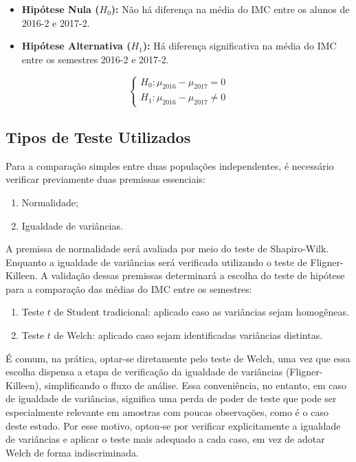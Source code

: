 \documentclass[
]{article}
\providecommand{\tightlist}{%
  \setlength{\itemsep}{0pt}\setlength{\parskip}{0pt}}
\begin{document}
\begin{itemize}
\tightlist
\item
  \textbf{Hipótese Nula (\(H_0\)):} Não há diferença na média do IMC entre os alunos de 2016-2 e 2017-2.
\item
  \textbf{Hipótese Alternativa (\(H_1\)):} Há diferença significativa na média do IMC entre os semestres 2016-2 e 2017-2.
\end{itemize}

\[
\begin{cases}
H_0: \mu_{2016} - \mu_{2017} = 0 \\
H_1: \mu_{2016} - \mu_{2017} \neq 0
\end{cases}
\]

\subsection{Tipos de Teste Utilizados}\label{tipos-de-teste-utilizados}

Para a comparação simples entre duas populações independentes, é necessário verificar previamente duas premissas essenciais:

\begin{enumerate}
\def\labelenumi{\arabic{enumi}.}
\tightlist
\item
  Normalidade;
\item
  Igualdade de variâncias.
\end{enumerate}

A premissa de normalidade será avaliada por meio do teste de Shapiro-Wilk. Enquanto a igualdade de variâncias será verificada utilizando o teste de Fligner-Killeen. A validação dessas premissas determinará a escolha do teste de hipótese para a comparação das médias do IMC entre os semestres:

\begin{enumerate}
\def\labelenumi{\arabic{enumi}.}
\tightlist
\item
  Teste \(t\) de Student tradicional: aplicado caso as variâncias sejam homogêneas.
\item
  Teste \(t\) de Welch: aplicado caso sejam identificadas variâncias distintas.
\end{enumerate}

É comum, na prática, optar-se diretamente pelo teste de Welch, uma vez que essa escolha dispensa a etapa de verificação da igualdade de variâncias (Fligner-Killeen), simplificando o fluxo de análise. Essa conveniência, no entanto, em caso de igualdade de variâncias, significa uma perda de poder de teste que pode ser especialmente relevante em amostras com poucas observações, como é o caso deste estudo. Por esse motivo, optou-se por verificar explicitamente a igualdade de variâncias e aplicar o teste mais adequado a cada caso, em vez de adotar Welch de forma indiscriminada.
\end{document}
